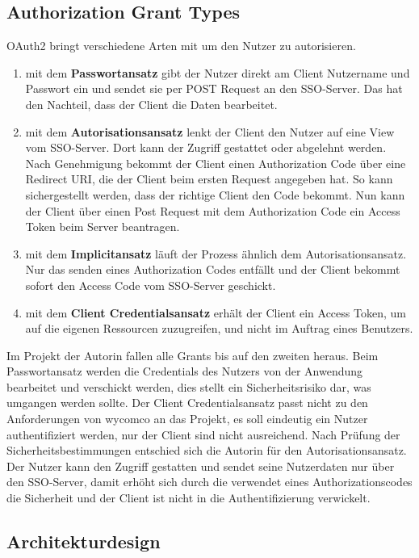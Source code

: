 \subsection{Authorization Grant Types}
\label{sec:AuthorizationGrants}

OAuth2 bringt verschiedene Arten mit um den Nutzer zu autorisieren.

\begin{enumerate}
\item mit dem \textbf{Passwortansatz} gibt der Nutzer direkt am Client Nutzername und Passwort ein und sendet sie per POST Request an den \ac{SSO}-Server. Das hat den Nachteil, dass der Client die Daten bearbeitet.
\item mit dem \textbf{Autorisationsansatz} lenkt der Client den Nutzer auf eine View vom \ac{SSO}-Server. Dort kann der Zugriff gestattet oder abgelehnt werden. Nach Genehmigung bekommt der Client einen Authorization Code über eine Redirect URI, die der Client beim ersten Request angegeben hat. So kann sichergestellt werden, dass der richtige Client den Code bekommt. Nun kann der Client über einen Post Request mit dem Authorization Code ein Access Token beim Server beantragen. 
\item mit dem \textbf{Implicitansatz} läuft der Prozess ähnlich dem Autorisationsansatz. Nur das senden eines Authorization Codes entfällt und der Client bekommt sofort den Access Code vom \ac{SSO}-Server geschickt.
\item mit dem \textbf{Client Credentialsansatz} erhält der Client ein Access Token, um auf die eigenen Ressourcen zuzugreifen, und nicht im Auftrag eines Benutzers.
\end{enumerate}

Im Projekt der Autorin fallen alle Grants bis auf den zweiten heraus. Beim Passwortansatz werden die Credentials des Nutzers von der Anwendung bearbeitet und verschickt werden, dies stellt ein Sicherheitsrisiko dar, was umgangen werden sollte.
Der Client Credentialsansatz passt nicht zu den Anforderungen von wycomco an das Projekt, es soll eindeutig ein Nutzer authentifiziert werden, nur der Client sind nicht ausreichend. Nach Prüfung der Sicherheitsbestimmungen entschied sich die Autorin für den Autorisationsansatz. Der Nutzer kann den Zugriff gestatten und sendet seine Nutzerdaten nur über den \ac{SSO}-Server, damit erhöht sich durch die verwendet eines Authorizationscodes die Sicherheit und der Client ist nicht in die Authentifizierung verwickelt.

\subsection{Architekturdesign}
\label{sec:Architekturdesign}

